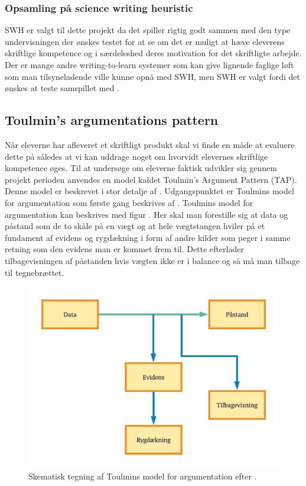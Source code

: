\subsubsection*{Opsamling på science writing heuristic}
SWH er valgt til dette projekt da det spiller rigtig godt sammen med den type undervisningen der ønskes testet for at se om det er muligt at hæve eleverens skriftlige kompetence og i særdeleshed deres motivation for det skriftligte arbejde. Der er mange andre writing-to-learn systemer som kan give lignende faglige løft som man tilsyneladende ville kunne opnå med SWH, men SWH er valgt fordi det ønskes at teste samspillet med \ib{}.

\subsection*{Toulmin's argumentations pattern}
Når eleverne har afleveret et skriftligt produkt skal vi finde en måde at evaluere dette på således at vi kan uddrage noget om hvorvidt elevernes skriftlige kompetence øges. Til at undersøge om eleverne faktisk udvikler sig gennem projekt perioden anvendes en model kaldet Toulmin's Argument Pattern (TAP). Denne model er beskrevet i stor detalje af \citet{Erduran2004}. Udgangspunktet er Toulmins model for argumentation som første gang beskrives af \citep{Toulmin1958}. Toulmins model for argumentation kan beskrives med figur . Her skal man forestille sig at data og påstand som de to skåle på en vægt og at hele vægtstangen hviler på et fundament af evidens og rygdækning i form af andre kilder som peger i samme retning som den evidens man er kommet frem til. Dette efterlader tilbagevisningen af påstanden hvis vægten ikke er i balance og så må man tilbage til tegnebrættet. 
\begin{figure}
	\centering
	\includegraphics[width=.75\textwidth]{Figs/Toulmin}
	\caption{Skematisk tegning af Toulmins model for argumentation efter \citet{Toulmin1958}.}
	\label{fig:tou}
\end{figure}

